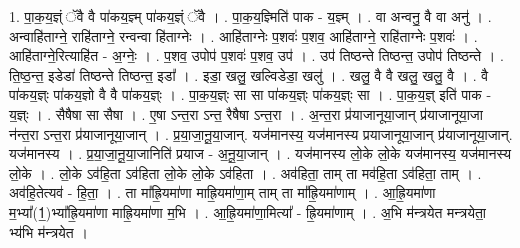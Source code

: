 \documentclass[17pt]{extarticle}
\begin{document}
1. पा॒क॒य॒ज्ञ्ं ॅवै वै पा॑कय॒ज्ञ्म् पा॑कय॒ज्ञ्ं ॅवै । . पा॒क॒य॒ज्ञ्मिति॑ पाक - य॒ज्ञ्म् । . वा अन्वनु॒ वै वा अनु॑ । . अन्वाहि॑ताग्ने॒ राहि॑ताग्ने॒ रन्वन्वा हि॑ताग्नेः । . आहि॑ताग्नेः प॒शवः॑ प॒शव॒ आहि॑ताग्ने॒ राहि॑ताग्नेः प॒शवः॑ । . आहि॑ताग्ने॒रित्याहि॑त - अ॒ग्नेः॒ । . प॒शव॒ उपोप॑ प॒शवः॑ प॒शव॒ उप॑ । . उप॑ तिष्ठन्ते तिष्ठन्त॒ उपोप॑ तिष्ठन्ते । . ति॒ष्ठ॒न्त॒ इडेडा॑ तिष्ठन्ते तिष्ठन्त॒ इडा᳚ । . इडा॒ खलु॒ खल्विडेडा॒ खलु॑ । . खलु॒ वै वै खलु॒ खलु॒ वै । . वै पा॑कय॒ज्ञ्ः पा॑कय॒ज्ञो वै वै पा॑कय॒ज्ञ्ः । . पा॒क॒य॒ज्ञ्ः सा सा पा॑कय॒ज्ञ्ः पा॑कय॒ज्ञ्ः सा । . पा॒क॒य॒ज्ञ् इति॑ पाक - य॒ज्ञ्ः । . सैषैषा सा सैषा । . ए॒षा ऽन्त॒रा ऽन्त॒ रैषैषा ऽन्त॒रा । . अ॒न्त॒रा प्र॑याजानूया॒जान् प्र॑याजानूया॒जा न॑न्त॒रा ऽन्त॒रा प्र॑याजानूया॒जान् । . प्र॒या॒जा॒नू॒या॒जान्. यज॑मानस्य॒ यज॑मानस्य प्रयाजानूया॒जान् प्र॑याजानूया॒जान्. यज॑मानस्य । . प्र॒या॒जा॒नू॒या॒जानिति॑ प्रयाज - अ॒नू॒या॒जान् । . यज॑मानस्य लो॒के लो॒के यज॑मानस्य॒ यज॑मानस्य लो॒के । . लो॒के ऽव॑हि॒ता ऽव॑हिता लो॒के लो॒के ऽव॑हिता । . अव॑हिता॒ ताम् ता मव॑हि॒ता ऽव॑हिता॒ ताम् । . अव॑हि॒तेत्यव॑ - हि॒ता॒ । . ता मा᳚ह्रि॒यमा॑णा माह्रि॒यमा॑णा॒म् ताम् ता मा᳚ह्रि॒यमा॑णाम् । . आ॒ह्रि॒यमा॑णा म॒भ्या᳚(1॒)भ्या᳚ह्रि॒यमा॑णा माह्रि॒यमा॑णा म॒भि । . आ॒ह्रि॒यमा॑णा॒मित्या᳚ - ह्रि॒यमा॑णाम् । . अ॒भि म॑न्त्रयेत मन्त्रयेता॒ भ्य॑भि म॑न्त्रयेत । \newline
\end{document}

